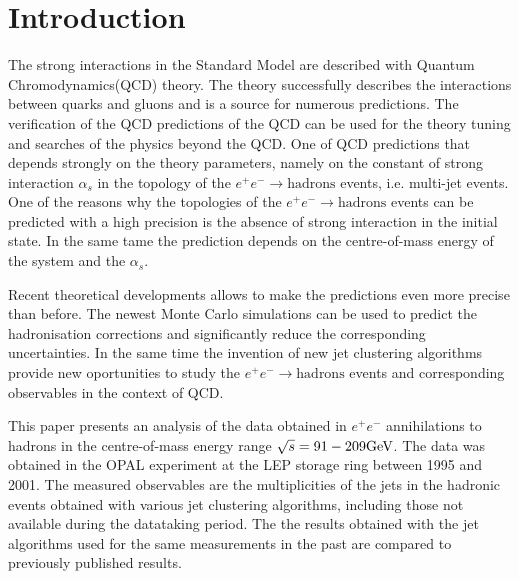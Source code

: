 \newpage
\section{Introduction}
\label{sec:introduction}
The strong interactions  in the Standard Model are described 
with Quantum Chromodynamics(QCD) theory. 
The theory successfully describes 
the interactions between quarks and gluons and is a source for numerous 
predictions. The verification of the QCD predictions of the QCD can
be used for the theory tuning and searches of the physics beyond the 
QCD.
One of QCD predictions that depends strongly on the theory parameters, namely on the constant of strong interaction $\alpha_s$ 
in the topology of the $e^+e^-\rightarrow \text{hadrons}$ events, i.e. multi-jet events. One of the reasons why the
topologies of the $e^+e^-\rightarrow \text{hadrons}$ events can be predicted with a high
precision is the absence of  strong interaction in the initial state. In the same tame the prediction depends on the 
centre-of-mass energy of the system and the $\alpha_s$.

Recent theoretical developments 
allows to make the predictions even more precise than before. %
The newest Monte Carlo simulations can be used to predict the 
hadronisation corrections and significantly reduce the corresponding uncertainties.%
In the same time the invention of new jet clustering algorithms provide new
 oportunities to study the $e^+e^-\rightarrow \text{hadrons}$ events and 
 corresponding observables in the context of QCD.

This paper presents an analysis of the data obtained in $e^+e^-$ 
annihilations to hadrons in the centre-of-mass energy range 
$\sqrt{s}=91-209{\text{Ge}\kern-0.06667em\text{V\/}}$. The data was obtained in the OPAL experiment 
at the LEP storage ring between 1995 and  2001. 
The measured observables are the multiplicities of the jets in the 
hadronic events obtained with various jet clustering algorithms,
including those not available during the datataking period.
The the results  obtained with the jet algorithms used for the same measurements
in the past are compared to previously published results.



